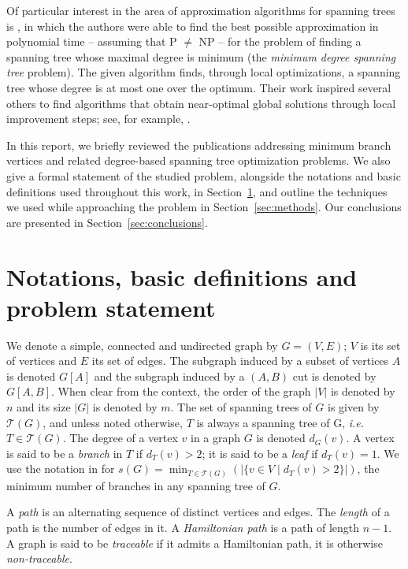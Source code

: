 \documentclass[12pt]{article}
\begin{document}
Of particular interest in the area of approximation algorithms for spanning trees is \cite{furer1992}, in which the authors were able to find the best possible approximation in polynomial time -- assuming that P $\neq$ NP -- for the problem of finding a spanning tree whose maximal degree is minimum (the \emph{minimum degree spanning tree} problem).
The given algorithm finds, through local optimizations, a spanning tree whose degree is at most one over the optimum. 
Their work inspired several others to find algorithms that obtain near-optimal global solutions through local improvement steps; see, for example, \cite{salamon2010, lu1996, chimani2015}.

In this report, we briefly reviewed the publications addressing minimum branch vertices and related degree-based spanning tree optimization problems.
We also give a formal statement of the studied problem, alongside the notations and basic definitions used throughout this work, in Section~\ref{sec:notations}, and outline the techniques we used while approaching the problem in Section~\ref{sec:methods}.
Our conclusions are presented in Section~\ref{sec:conclusions}.

\section{Notations, basic definitions and problem statement} \label{sec:notations}

We denote a simple, connected and undirected graph by $G = (V, E)$; $V$ is its set of vertices and $E$ its set of edges.
The subgraph induced by a subset of vertices $A$ is denoted $G[A]$ and the subgraph induced by a $(A, B)$ cut is denoted by $G[A, B]$.
When clear from the context, the order of the graph $|V|$ is denoted by $n$ and its size $|G|$ is denoted by $m$.
The set of spanning trees of $G$ is given by $\mathcal{T}(G)$, and unless noted otherwise, $T$ is always a spanning tree of G, \emph{i.e.} $T \in \mathcal{T}(G)$.
The degree of a vertex $v$ in a graph $G$ is denoted $d_G(v)$.
A vertex is said to be a \emph{branch} in $T$ if $d_T(v) > 2$; it is said to be a \emph{leaf} if $d_T(v) = 1$.
We use the notation in \cite{gargano2004} for $s(G) = \min_{T \in \mathcal{T}(G)}(|\{v \in V \mid d_T(v) > 2 \}|)$, the minimum number of branches in any spanning tree of $G$.

A \emph{path} is an alternating sequence of distinct vertices and edges.
The \emph{length} of a path is the number of edges in it.
A \emph{Hamiltonian path} is a path of length $n - 1$.
A graph is said to be \emph{traceable} if it admits a Hamiltonian path, it is otherwise \emph{non-traceable}.
\end{document}
